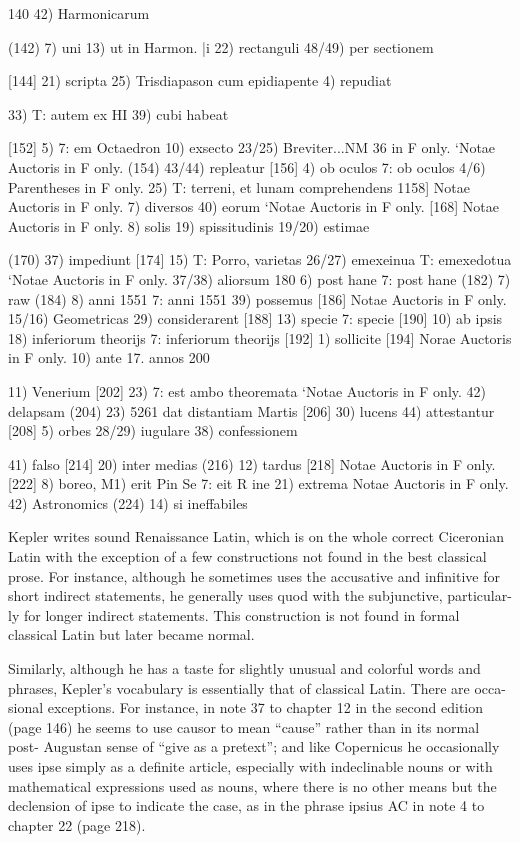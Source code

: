 \documentclass{article}
\begin{document}
{{140} 42) Harmonicarum

(142) 7) uni
13) ut in Harmon. |i
22) rectanguli
48/49) per sectionem

[144] 21) scripta
25) Trisdiapason cum epidiapente
4) repudiat

33) T: autem ex HI
39) cubi habeat



[152] 5) 7: em Octaedron
10) exsecto
23/25) Breviter...NM 36 in F only.
‘Notae Auctoris in F only.
(154) 43/44) repleatur
[156] 4) ob oculos 7: ob oculos
4/6) Parentheses in F only.
25) T: terreni, et lunam comprehendens
1158] Notae Auctoris in F only.
7) diversos
40) eorum
‘Notae Auctoris in F only.
[168] Notae Auctoris in F only.
8) solis
19) spissitudinis
19/20) estimae


(170) 37) impediunt
[174] 15) T: Porro, varietas
26/27) emexeinua T: emexedotua
‘Notae Auctoris in F only.
37/38) aliorsum
{180} 6) post hane 7: post hane
(182) 7) raw
(184) 8) anni 1551 7: anni 1551
39) possemus
[186] Notae Auctoris in F only.
15/16) Geometricas
29) considerarent
[188] 13) specie 7: specie
[190] 10) ab ipsis
18) inferiorum theorijs 7: inferiorum
theorijs
[192] 1) sollicite
[194] Norae Auctoris in F only.
10) ante 17. annos
200} 11) Venerium
[202] 23) 7: est ambo theoremata
‘Notae Auctoris in F only.
42) delapsam
(204) 23) 5261 dat distantiam Martis
[206] 30) lucens
44) attestantur
[208] 5) orbes
28/29) iugulare
38) confessionem

41) falso
[214] 20) inter medias
(216) 12) tardus
[218] Notae Auctoris in F only.
[222] 8) boreo,
M1) erit Pin Se 7: eit R ine
21) extrema
Notae Auctoris in F only.
42) Astronomics
(224) 14) si ineffabiles


Kepler writes sound Renaissance Latin, which is on the whole correct Ciceronian
Latin with the exception of a few constructions not found in the best classical
prose. For instance, although he sometimes uses the accusative and infinitive for
short indirect statements, he generally uses quod with the subjunctive, particular-
ly for longer indirect statements. This construction is not found in formal
classical Latin but later became normal.

Similarly, although he has a taste for slightly unusual and colorful words and
phrases, Kepler’s vocabulary is essentially that of classical Latin. There are occa-
sional exceptions. For instance, in note 37 to chapter 12 in the second edition
(page 146) he seems to use causor to mean “cause” rather than in its normal post-
Augustan sense of “give as a pretext”; and like Copernicus he occasionally uses
ipse simply as a definite article, especially with indeclinable nouns or with
mathematical expressions used as nouns, where there is no other means but the
declension of ipse to indicate the case, as in the phrase ipsius AC in note 4 to
chapter 22 (page 218).
\end{document}
